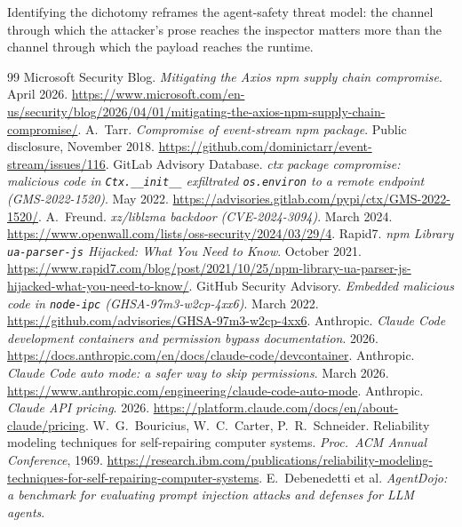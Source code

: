 \documentclass[11pt,letterpaper]{article}
\begin{document}
Identifying the dichotomy reframes the agent-safety threat model:
the channel through which the attacker's prose reaches the
inspector matters more than the channel through which the payload
reaches the runtime.


\begin{thebibliography}{99}
Microsoft Security Blog.
\textit{Mitigating the Axios npm supply chain compromise}.
April 2026. \url{https://www.microsoft.com/en-us/security/blog/2026/04/01/mitigating-the-axios-npm-supply-chain-compromise/}.
A.~Tarr.
\textit{Compromise of event-stream npm package}.
Public disclosure, November 2018.
\url{https://github.com/dominictarr/event-stream/issues/116}.
GitLab Advisory Database.
\textit{ctx package compromise: malicious code in \texttt{Ctx.\_\_init\_\_} exfiltrated \texttt{os.environ} to a remote endpoint (GMS-2022-1520)}.
May 2022. \url{https://advisories.gitlab.com/pypi/ctx/GMS-2022-1520/}.
A.~Freund.
\textit{xz/liblzma backdoor (CVE-2024-3094)}.
March 2024. \url{https://www.openwall.com/lists/oss-security/2024/03/29/4}.
Rapid7.
\textit{npm Library \texttt{ua-parser-js} Hijacked: What You Need to Know}.
October 2021. \url{https://www.rapid7.com/blog/post/2021/10/25/npm-library-ua-parser-js-hijacked-what-you-need-to-know/}.
GitHub Security Advisory.
\textit{Embedded malicious code in \texttt{node-ipc} (GHSA-97m3-w2cp-4xx6)}.
March 2022. \url{https://github.com/advisories/GHSA-97m3-w2cp-4xx6}.
Anthropic.
\textit{Claude Code development containers and permission bypass documentation}.
2026. \url{https://docs.anthropic.com/en/docs/claude-code/devcontainer}.
Anthropic.
\textit{Claude Code auto mode: a safer way to skip permissions}.
March 2026. \url{https://www.anthropic.com/engineering/claude-code-auto-mode}.
Anthropic.
\textit{Claude API pricing}.
2026. \url{https://platform.claude.com/docs/en/about-claude/pricing}.
W.~G.~Bouricius, W.~C.~Carter, P.~R.~Schneider.
Reliability modeling techniques for self-repairing computer systems.
\textit{Proc.\ ACM Annual Conference}, 1969.
\url{https://research.ibm.com/publications/reliability-modeling-techniques-for-self-repairing-computer-systems}.
E.~Debenedetti et al.
\textit{AgentDojo: a benchmark for evaluating prompt injection attacks and defenses for LLM agents}.

\end{thebibliography}
\end{document}
